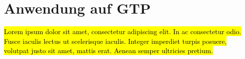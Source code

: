 

\chapter{Anwendung auf GTP}

\hl{Lorem ipsum dolor sit amet, consectetur adipiscing elit. In ac consectetur odio. Fusce iaculis lectus ut scelerisque iaculis. Integer imperdiet turpis posuere, volutpat justo sit amet, mattis erat. Aenean semper ultricies pretium.}


